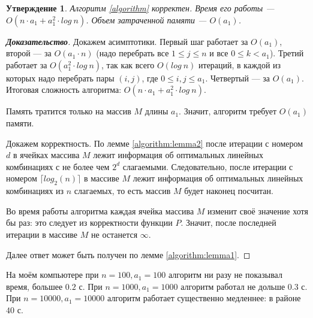 \documentclass[12pt]{article}
\newtheorem{proposition}[theorem]{Утверждение}
\begin{document}
\begin{proposition}
Алгоритм \ref{algorithm} корректен. Время его работы --- $O(n \cdot a_1 + a_1^2 \cdot log \ n)$. Объем затраченной памяти --- $O(a_1)$.
\end{proposition}
\begin{proof}[\textbf{Доказательство}]
Докажем асимптотики. Первый шаг работает за $O(a_1)$, второй --- за $O(a_1 \cdot n)$ (надо перебрать все $1 \le j \le n$ и все $0 \le k < a_1$). Третий работает за $O(a_1^2 \cdot log \ n)$, так как всего $O(log \ n)$ итераций, в каждой из которых надо перебрать пары $(i, j)$, где $0 \le i, j \le a_1$. Четвертый --- за $O(a_1)$. Итоговая сложность алгоритма: $O(n \cdot a_1 + a_1^2 \cdot log \ n)$.

Память тратится только на массив $M$ длины $a_1$. Значит, алгоритм требует $O(a_1)$ памяти.

Докажем корректность. По лемме \ref{algorithm:lemma2} после итерации с номером $d$ в ячейках массива $M$ лежит информация об оптимальных линейных комбинациях с не более чем $2^d$ слагаемыми. Следовательно, после итерации с номером $\lceil log_2(n) \rceil$ в массиве $M$ лежит информация об оптимальных линейных комбинациях из $n$ слагаемых, то есть массив $M$ будет наконец посчитан.

Во время работы алгоритма каждая ячейка массива $M$ изменит своё значение хотя бы раз: это следует из корректности функции $P$. Значит, после последней итерации в массиве $M$ не останется $\infty$.

Далее ответ может быть получен по лемме \ref{algorithm:lemma1}.
\end{proof}

На моём компьютере при $n = 100, a_1 = 100$ алгоритм ни разу не показывал время, большее $0.2$ с. При $n = 1000, a_1 = 1000$ алгоритм работал не дольше $0.3$ с. При $n = 10000, a_1 = 10000$ алгоритм работает существенно медленнее: в районе $40$ с.
\end{document}
